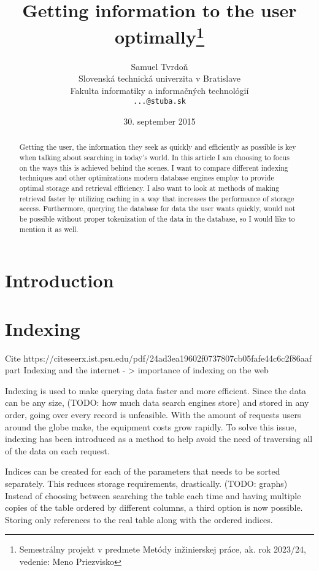 \documentclass[10pt,a4paper]{article}
\title{Getting information to the user optimally\thanks{Semestrálny projekt v predmete Metódy inžinierskej práce, ak. rok 2023/24, vedenie: Meno Priezvisko}} %
\author{Samuel Tvrdoň\\[2pt]
	{\small Slovenská technická univerzita v Bratislave}\\
	{\small Fakulta informatiky a informačných technológií}\\
	{\small \texttt{...@stuba.sk}}
	}
\date{\small 30. september 2015} %
\begin{document}
\maketitle

\begin{abstract}
Getting the user, the information they seek as quickly and efficiently as possible is key when talking about searching in today’s world. In this article I am choosing to focus on the ways this is achieved behind the scenes. I want to compare different indexing techniques and other optimizations modern database engines employ to provide optimal storage and retrieval efficiency. I also want to look at methods of making retrieval faster by utilizing caching in a way that increases the performance of storage access. Furthermore, querying the database for data the user wants quickly, would not be possible without proper tokenization of the data in the database, so I would like to mention it as well.
\end{abstract}

\section{Introduction}

\lipsum[1]

\section{Indexing}
Cite https://citeseerx.ist.psu.edu/pdf/24ad3ea19602f0737807cb05fafe44c6c2f86aaf part Indexing and the internet - > importance of indexing on the web

Indexing is used to make querying data faster and more efficient. Since the data can be any size, (TODO: how much data search engines store) and stored in any order, going over every record is unfeasible. With the amount of requests users around the globe make, the equipment costs grow rapidly. To solve this issue, indexing has been introduced as a method to help avoid the need of traversing all of the data on each request.

Indices can be created for each of the parameters that needs to be sorted separately. This reduces storage requirements, drastically. (TODO: graphs) Instead of choosing between searching the table each time and having multiple copies of the table ordered by different columns, a third option is now possible. Storing only references to the real table along with the ordered indices. 
\end{document}
